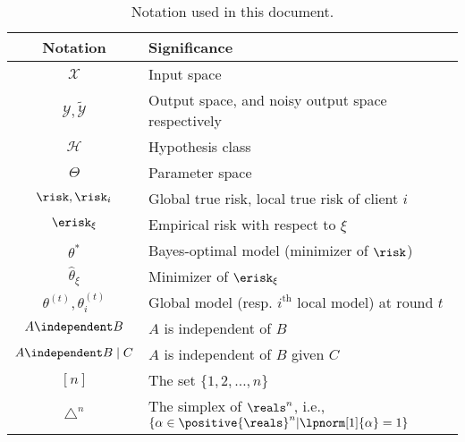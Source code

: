 \begin{table}[h]
	\caption{Notation used in this document.}
	\label{tab:notations}
	\begin{center}
		\begin{tabularx}{\linewidth}{cX}
			\toprule
			\textbf{Notation}                    & \textbf{Significance}                                                                                                      \\
			\midrule
			\(\mathcal{X}\)                      & Input space                                                                                                                \\
			\(\mathcal{Y}, \tilde{\mathcal{Y}}\) & Output space, and noisy output space respectively                                                                          \\
			\(\mathcal{H}\)                      & Hypothesis class                                                                                                           \\
			\(\Theta\)                           & Parameter space                                                                                                            \\
			\(\risk, \risk_{i}\)                 & Global true risk, local true risk of client \(i\)                                                                          \\
			\(\erisk_{\xi}\)                     & Empirical risk with respect to \(\xi\)                                                                                     \\
			\(\theta^{\ast}\)                    & Bayes-optimal model (minimizer of \(\risk\))                                                                               \\
			\(\hat{\theta}_{\xi}\)               & Minimizer of \(\erisk_{\xi}\)                                                                                              \\
			\(\theta^{(t)},\theta_{i}^{(t)}\)    & Global model (resp. \(i^{\mathrm{th}}\) local model) at round \(t\)                                                        \\
			\(A \independent B\)                 & \(A\) is independent of \(B\)                                                                                              \\
			\(A \independent B \mid C\)          & \(A\) is independent of \(B\) given \(C\)                                                                                  \\
			\([n]\)                              & The set \(\{1, 2, \ldots, n\}\)                                                                                            \\
			\(\triangle^{n}\)                    & The simplex of \(\reals^{n}\), i.e., \(\left\{ \alpha \in \positive{\reals}^{n} \middle| \lpnorm[1]{\alpha} = 1 \right\}\) \\
			\bottomrule
		\end{tabularx}
	\end{center}


\end{table}
